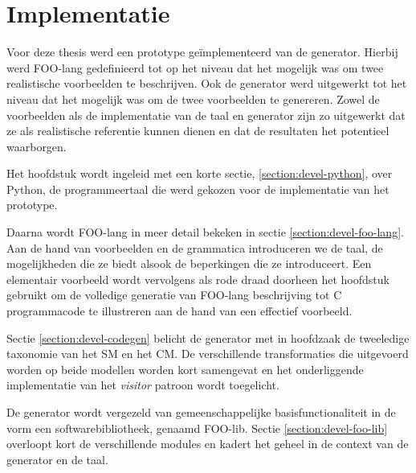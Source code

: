 
\chapter{Implementatie}
\label{chapter:implementatie}

Voor deze thesis werd een prototype ge\"implementeerd van de generator. Hierbij
werd FOO-lang gedefinieerd tot op het niveau dat het mogelijk was om twee
realistische voorbeelden te beschrijven. Ook de generator werd uitgewerkt tot
het niveau dat het mogelijk was om de twee voorbeelden te genereren. Zowel de
voorbeelden als de implementatie van de taal en generator zijn zo uitgewerkt
dat ze als realistische referentie kunnen dienen en dat de resultaten het
potentieel waarborgen.

Het hoofdstuk wordt ingeleid met een korte sectie, \ref{section:devel-python},
over Python, de programmeertaal die werd gekozen voor de implementatie van het
prototype.

Daarna wordt FOO-lang in meer detail bekeken in sectie
\ref{section:devel-foo-lang}. Aan de hand van voorbeelden en de grammatica
introduceren we de taal, de mogelijkheden die ze biedt alsook de beperkingen
die ze introduceert. Een elementair voorbeeld wordt vervolgens als rode draad
doorheen het hoofdstuk gebruikt om de volledige generatie van FOO-lang
beschrijving tot C programmacode te illustreren aan de hand van een effectief
voorbeeld.

Sectie \ref{section:devel-codegen} belicht de generator met in hoofdzaak de
tweeledige taxonomie van het SM en het CM. De verschillende transformaties die
uitgevoerd worden op beide modellen worden kort samengevat en het onderliggende
implementatie van het \emph{visitor} patroon \citep{gamma1994design} wordt
toegelicht.

De generator wordt vergezeld van gemeenschappelijke basisfunctionaliteit in de
vorm een softwarebibliotheek, genaamd FOO-lib. Sectie
\ref{section:devel-foo-lib} overloopt kort de verschillende modules en kadert
het geheel in de context van de generator en de taal.






